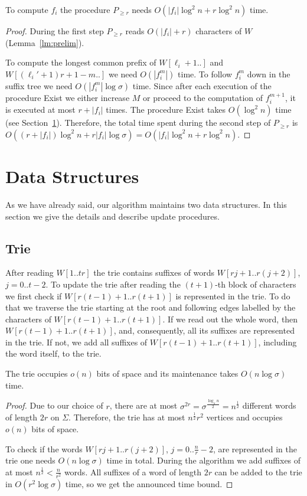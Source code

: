 \documentclass[10pt]{llncs}
\newcommand{\exist}{{\sc Exist}}
\begin{document}
\begin{lemma}
\label{lm:second_step}
To compute $f_i$ the procedure $P_{\geq r}$ needs $O(|f_i|\log^2{n}+r\log^2{n})$ time.
\end{lemma}
\begin{proof}
During the first step $P_{\geq r}$ reads $O(|f_i|+r)$ characters of $W$ (Lemma~\ref{lm:prelim}).

To compute the longest common prefix of $W[\ell_i+1..]$ and $W[(\ell_i'+1)r+1-m..]$ we need $O(|f_i^m|)$ time. To follow $f_i^m$ down in the suffix tree we need $O(|f_i^m|\log \sigma)$ time. Since after each execution of the procedure \exist{} we either increase $M$ or proceed to the computation of $f_i^{m+1}$, it is executed at most $r + |f_i|$ times. The procedure \exist{} takes $O(\log^2{n})$ time (see Section~\ref{sec:DS}). Therefore, the total time spent during the second step of $P_{\geq r}$ is $O((r + |f_i|)\log^2{n} + r|f_i|\log\sigma) = O(|f_i|\log^{2}{n}+r\log^2{n})$.
\end{proof}


\section{Data Structures}
\label{sec:DS}
As we have already said, our algorithm maintains two data structures. In this section we give the details and describe update procedures.

\subsection{Trie}
After reading $W[1..tr]$ the trie contains suffixes of words $W[rj+1..r(j+2)]$, $j = 0..t-2$. To update the trie after reading the $(t+1)$-th block of characters we first check if $W[r(t-1)+1..r(t+1)]$ is represented in the trie. To do that we traverse the trie starting at the root and following edges labelled by the characters of $W[r(t-1)+1..r(t+1)]$. If we read out the whole word, then $W[r(t-1)+1..r(t+1)]$, and, consequently, all its suffixes are represented in the trie. If not, we add all suffixes of $W[r(t-1)+1..r(t+1)]$, including the word itself, to the trie. 

\begin{lemma}
\label{lm:CT}
The trie occupies $o(n)$ bits of space and its maintenance takes $O(n\log\sigma)$ time.
\end{lemma}
\begin{proof}
Due to our choice of $r$, there are at most $\sigma^{2r} = \sigma^{\frac{\log_{\sigma}{n}}{2}} = n^{\frac{1}{2}}$ different words of length $2r$ on $\Sigma$. Therefore, the trie has at most $n^{\frac{1}{2}} r^2$ vertices and occupies $o(n)$ bits of space.

To check if the words $W[rj+1..r(j+2)]$, $j = 0..\frac{n}{r}-2$, are represented in the trie one needs $O(n\log\sigma)$ time in total. During the algorithm we add suffixes of at most $n^{\frac{1}{2}} < \frac{n}{r^2}$ words. All suffixes of a word of length $2r$ can be added to the trie in $O(r^2 \log\sigma)$ time, so we get the announced time bound.
\end{proof}
\end{document}
